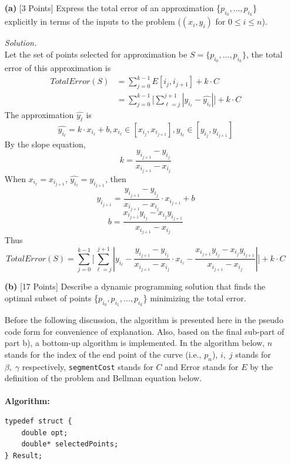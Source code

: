 \documentclass[10pt]{article}
\begin{document}
\begin{enumerate}
    \item [\textbf{(a)}] {[3 Points]} Express the total error of an approximation \{$p_{i_0}, ... ,p_{i_k}$\} explicitly in terms of the inputs to the problem ($(x_i, y_i)$ for $0 \leq i \leq n$).
    \begin{mdframed}
        \textit{Solution.}\\
        Let the set of points selected for approximation be $S = \{p_{i_0}, ..., p_{i_k}\}$, the total error of this approximation is
        \begin{align*}
            TotalError(S) &= \sum_{j = 0}^{k - 1} E[i_j, i_{j + 1}] + k \cdot C\\
            &= \sum_{j = 0}^{k - 1} \Bigg[\sum_{\ell = j}^{j + 1} |y_{i_{\ell}} - \hat{y_{i_{\ell}}}| \Bigg] + k \cdot C
        \end{align*}
        The approximation $\hat{y_{\ell}}$ is
        \[\hat{y_{i_{\ell}}} = k \cdot x_{i_{\ell}} + b, x_{i_{\ell}} \in [x_{i_j}, x_{i_{j + 1}}], y_{i_{\ell}} \in [y_{i_j}, y_{i_{j + 1}}]\]
        By the slope equation,
        \[k = \frac{y_{i_{j + 1}} - y_{i_j}}{x_{i_{j + 1}} - x_{i_j}}\]
        When $x_{i_{\ell}} = x_{i_{j + 1}}$, $\hat{y_{i_{\ell}}} = y_{i_{j + 1}}$, then
        \[y_{i_{j + 1}} = \frac{y_{i_{j + 1}} - y_{i_j}}{x_{i_{j + 1}} - x_{i_j}} \cdot x_{i_{j + 1}} + b\]
        \[b = \frac{x_{i_{j + 1}}y_{i_j} - x_{i_j}y_{i_{j + 1}}}{x_{i_{j + 1}} - x_{i_j}}\]
        Thus
        \[TotalError(S) = \sum_{j = 0}^{k - 1} \Bigg[\sum_{\ell = j}^{j + 1} |y_{i_{\ell}} - \frac{y_{i_{j + 1}} - y_{i_j}}{x_{i_{j + 1}} - x_{i_j}} \cdot x_{i_{\ell}} - \frac{x_{i_{j + 1}}y_{i_j} - x_{i_j}y_{i_{j + 1}}}{x_{i_{j + 1}} - x_{i_j}}| \Bigg] + k \cdot C\]
    \end{mdframed}
    \item [\textbf{(b)}] {[17 Points]} Describe a dynamic programming solution that finds the optimal subset of points \{$p_{i_0}, p_{i_1}, ..., p_{i_k}$\} minimizing the total error.
    \begin{mdframed}
    Before the following discussion, the algorithm is presented here in the pseudo code form for convenience of explanation. Also, based on the final sub-part of part b), a bottom-up algorithm is implemented. In the algorithm below, $n$ stands for the index of the end point of the curve (i.e., $p_n$), $i, \; j$ stands for $\beta, \; \gamma$ respectively, \texttt{segmentCost} stands for $C$ and Error stands for $E$ by the definition of the problem and Bellman equation below.\\
    \\
    \textbf{Algorithm:}
     \lstset{language=C}
    \begin{lstlisting}
typedef struct {
    double opt;
    double* selectedPoints;
} Result;


\end{lstlisting}
\end{mdframed}
\end{enumerate}
\end{document}

